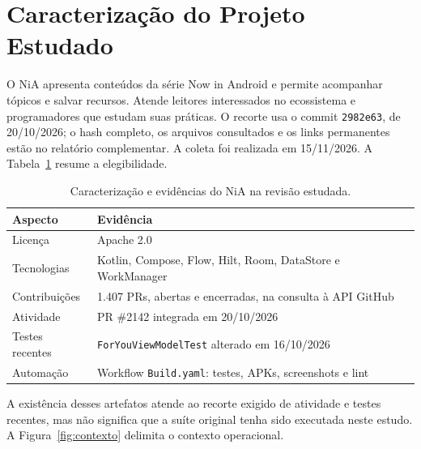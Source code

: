 \section{Caracterização do Projeto Estudado}\label{sec:projeto}
O NiA apresenta conteúdos da série Now in Android e permite acompanhar tópicos
e salvar recursos. Atende leitores interessados no ecossistema e
programadores que estudam suas práticas. O recorte usa o commit
\texttt{2982e63}, de 20/10/2026; o hash completo, os arquivos consultados e os
links permanentes estão no relatório complementar. A coleta foi realizada
em 15/11/2026. A Tabela~\ref{tab:caracterizacao} resume a elegibilidade.

\begin{table}[htb]
\caption{Caracterização e evidências do NiA na revisão estudada.}
\label{tab:caracterizacao}
\centering
\begin{tabularx}{\columnwidth}{@{}lX@{}}
\toprule
Aspecto & Evidência \\
\midrule
Licença & Apache 2.0 \\
Tecnologias & Kotlin, Compose, Flow, Hilt, Room, DataStore e WorkManager \\
Contribuições & 1.407 PRs, abertas e encerradas, na consulta à API GitHub \\
Atividade & PR \#2142 integrada em 20/10/2026 \\
Testes recentes & \texttt{For\allowbreak You\allowbreak View\allowbreak Model\allowbreak Test} alterado em 16/10/2026 \\
Automação & Workflow \texttt{Build.yaml}: testes, APKs, screenshots e lint \\
\bottomrule
\end{tabularx}
\end{table}

A existência desses artefatos atende ao recorte exigido de atividade e testes
recentes, mas não significa que a suíte original tenha sido executada neste
estudo. A Figura~\ref{fig:contexto} delimita o contexto operacional.
